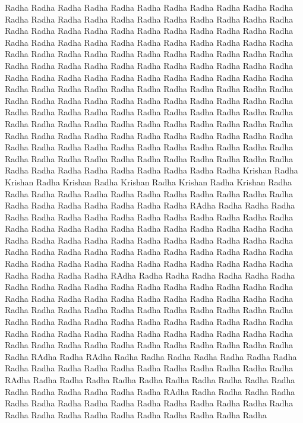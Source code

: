 Radha Radha Radha Radha Radha Radha Radha Radha Radha Radha Radha Radha Radha Radha Radha Radha Radha Radha
Radha Radha Radha Radha Radha Radha Radha Radha Radha Radha Radha Radha Radha Radha Radha Radha Radha Radha
Radha Radha Radha Radha Radha Radha Radha Radha Radha Radha Radha Radha Radha Radha Radha Radha Radha Radha
Radha Radha Radha Radha Radha Radha Radha Radha Radha Radha Radha Radha Radha Radha Radha Radha Radha Radha 
Radha Radha Radha Radha Radha Radha Radha Radha Radha Radha Radha Radha Radha Radha Radha Radha Radha Radha
Radha Radha Radha Radha Radha Radha Radha Radha Radha Radha Radha Radha Radha Radha Radha Radha Radha Radha 
Radha Radha Radha Radha Radha Radha Radha Radha Radha Radha Radha Radha Radha Radha Radha Radha Radha Radha
Radha Radha Radha Radha Radha Radha Radha Radha Radha Radha Radha Radha Radha Radha Radha Radha Radha Radha
Radha Radha Radha Radha Radha Radha Radha Radha Radha Radha Radha Radha Radha Radha Radha Radha Radha Radha 
Radha Krishan Radha Krishan Radha Krishan Radha Krishan Radha Krishan Radha Krishan Radha Radha Radha Radha
Radha Radha Radha Radha Radha Radha Radha Radha Radha Radha Radha Radha Radha Radha Radha RAdha Radha Radha 
Radha Radha Radha Radha Radha Radha Radha Radha Radha Radha Radha Radha Radha Radha Radha Radha Radha Radha
Radha Radha Radha Radha Radha Radha Radha Radha Radha Radha Radha Radha Radha Radha Radha Radha Radha Radha 
Radha Radha Radha Radha Radha Radha Radha Radha Radha Radha Radha Radha Radha Radha Radha Radha Radha Radha
Radha Radha Radha Radha Radha Radha RAdha Radha Radha Radha Radha Radha Radha Radha Radha Radha Radha Radha 
Radha Radha Radha Radha Radha Radha Radha Radha Radha Radha Radha Radha Radha Radha Radha Radha Radha Radha 
Radha Radha Radha Radha Radha Radha Radha Radha Radha Radha Radha Radha Radha Radha Radha Radha Radha Radha
Radha Radha Radha Radha Radha Radha Radha Radha Radha Radha Radha Radha Radha Radha Radha Radha Radha Radha 
Radha Radha Radha Radha Radha Radha Radha Radha RAdha Radha RAdha Radha Radha Radha Radha Radha Radha Radha 
Radha Radha Radha Radha Radha Radha Radha Radha Radha Radha Radha RAdha Radha Radha Radha Radha Radha Radha
Radha Radha Radha Radha Radha Radha Radha Radha Radha Radha RAdha Radha Radha Radha Radha Radha Radha Radha 
Radha Radha Radha Radha Radha Radha Radha Radha Radha Radha Radha Radha Radha Radha Radha Radha Radha Radha
